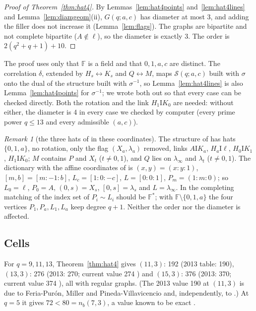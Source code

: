 \documentclass[11pt]{amsart}
\theoremstyle{definition}
\theoremstyle{remark}
\newtheorem{remark}[theorem]{Remark}
\numberwithin{equation}{section}
\newcommand{\F}{\mathbb F}
\newcommand{\I}{\mathrel{\mathrm I}}
\newcommand{\nb}{n_b}
\newcommand{\cS}{\mathcal S}
\begin{document}
\begin{proof}[Proof of Theorem~\ref{thm:hat4}]
By Lemmas~\ref{lem:hat4points} and~\ref{lem:hat4lines} and Lemma~\ref{lem:diamgeom}(ii), $G(q;a,c)$ has diameter at
most 3, and adding the filler does not increase it (Lemma~\ref{lem:flags}). The graphs are bipartite and not complete
bipartite ($A\notin\ell$), so the diameter is exactly 3. The order is $2(q^2+q+1)+10$.
\end{proof}

The proof uses only that $\F$ is a field and that $0,1,a,c$ are distinct. The correlation $\delta$, extended by
$H_s\leftrightarrow K_s$ and $Q\leftrightarrow M$, maps $\cS(q;a,c)$ built with $\sigma$ onto the dual of the structure
built with $\sigma^{-1}$, so Lemma~\ref{lem:hat4lines} is also Lemma~\ref{lem:hat4points} for $\sigma^{-1}$; we wrote both
out so that every case can be checked directly. Both the rotation and the link $H_1\I K_0$ are needed: without either,
the diameter is 4 in every case we checked by computer (every prime power $q\le13$ and every admissible $(a,c)$).

\begin{remark}[the three hats of {\cite{AL20}} in these coordinates]\label{rem:AL}
The structure of \cite{AL20} has hats $\{0,1,a\}$, no rotation, only the flag $(X_a,\lambda_a)$ removed, links $A\I
K_a$, $H_a\I\ell$, $H_0\I K_1$, $H_1\I K_0$; $M$ contains $P$ and $X_t$ ($t\ne0,1$), and $Q$ lies on $\lambda_\infty$ and
$\lambda_t$ ($t\ne0,1$). The dictionary with the affine coordinates of \cite{AL20} is $(x,y)=(x:y:1)$, $[m,b]=[m:-1:b]$,
$L_c=[1:0:-c]$, $L=[0:0:1]$, $P_m=(1:m:0)$; so $L_0=\ell$, $P_0=A$, $(0,s)=X_s$, $[0,s]=\lambda_s$ and $L=\lambda_\infty$.
In the completing matching of \cite[arXiv v1, p.~8]{AL20} the index set of $P_i\sim L_i$ should be $\F^*$; with
$\F\setminus\{0,1,a\}$ the four vertices $P_1,P_a,L_1,L_a$ keep degree $q+1$. Neither the order nor the diameter is
affected.
\end{remark}

\subsection{Cells}
For $q=9,11,13$, Theorem~\ref{thm:hat4} gives $(11,3)$: 192 (2013 table: 190), $(13,3)$: 276 (2013: 270; current value
274 \cite{AL20}) and $(15,3)$: 376 (2013: 370; current value 374 \cite{AL20}), all with regular graphs. (The 2013 value
190 at $(11,3)$ is due to Feria-Pur\'on, Miller and Pineda-Villavicencio \cite{FMP13} and, independently, to
\cite{AL20}.) At $q=5$ it gives $72<80=\nb(7,3)$, a value known to be exact \cite{FMP13}.
\end{document}
